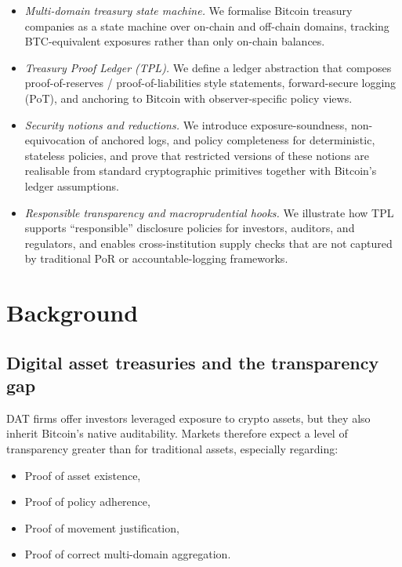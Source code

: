 \documentclass[11pt]{article}
\begin{document}
\begin{itemize}[noitemsep]
\item \emph{Multi-domain treasury state machine.} We formalise Bitcoin treasury companies as a state machine over on-chain and off-chain domains, tracking BTC-equivalent exposures rather than only on-chain balances.
\item \emph{Treasury Proof Ledger (TPL).} We define a ledger abstraction that composes proof-of-reserves / proof-of-liabilities style statements, forward-secure logging (PoT), and anchoring to Bitcoin with observer-specific policy views.
\item \emph{Security notions and reductions.} We introduce exposure-soundness, non-equivocation of anchored logs, and policy completeness for deterministic, stateless policies, and prove that restricted versions of these notions are realisable from standard cryptographic primitives together with Bitcoin's ledger assumptions.
\item \emph{Responsible transparency and macroprudential hooks.} We illustrate how TPL supports ``responsible'' disclosure policies for investors, auditors, and regulators, and enables cross-institution supply checks that are not captured by traditional PoR or accountable-logging frameworks.
\end{itemize}

\section{Background}
\label{sec:background}

\subsection{Digital asset treasuries and the transparency gap}

DAT firms offer investors leveraged exposure to crypto assets, but they also inherit Bitcoin's native auditability. Markets therefore expect a level of transparency greater than for traditional assets, especially regarding:

\begin{itemize}[noitemsep]
\item Proof of asset existence,
\item Proof of policy adherence,
\item Proof of movement justification,
\item Proof of correct multi-domain aggregation.
\end{itemize}
\end{document}
